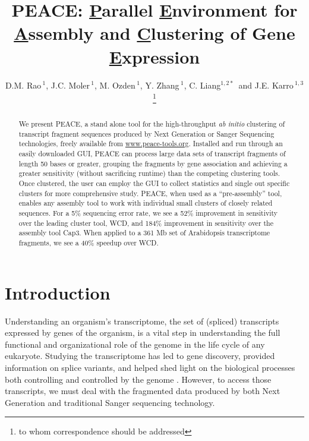 \documentclass[a4,center,fleqn]{NAR}
\newcommand{\peace} {{\small PEACE}}
\newcommand{\wcd} {{\small WCD}}
\newcommand{\capthree} {{\small Cap3}}
\begin{document}
\title{PEACE: {\underline P}arallel {\underline E}nvironment for {\underline A}ssembly
  and {\underline C}lustering of Gene {\underline E}xpression}

\author{D.M. Rao\,$^{1}$, J.C. Moler\,$^{1}$, M. Ozden\,$^1$, Y. Zhang\,$^{1}$,
  C. Liang$^{1,2*}$\, and J.E. Karro\,$^{1,3}$\footnote{to whom
    correspondence should be addressed}}

\address{$^1$ Department of Computer Science and Software Engineering, \\
  $^2$ Department of Botany, \\
  $^3$ and Department of Microbiology, Miami University, Oxford, Ohio,
  USA}




\maketitle

\begin{abstract}
  We present \peace, a stand alone tool for the high-throughput {\it
    ab initio} clustering of transcript fragment sequences produced by
  Next Generation or Sanger Sequencing technologies, freely available
  from \href{http://www.peace-tools.org}{www.peace-tools.org}.
  Installed and run through an easily downloaded GUI, \peace\/ can
  process large data sets of transcript fragments of length 50 bases
  or greater, grouping the fragments by gene association and achieving
  a greater sensitivity (without sacrificing runtime) than the
  competing clustering tools.  Once clustered, the user can employ the
  GUI to collect statistics and single out specific clusters for more
  comprehensive study.  \peace\/, when used as a ``pre-assembly''
  tool, enables any assembly tool to work with individual small
  clusters of closely related sequences.  For a 5\% sequencing error
  rate, we see a 52\% improvement in sensitivity over the leading
  cluster tool, \wcd\/, and 184\% improvement in sensitivity over the
  assembly tool \capthree.  When applied to a 361 Mb set of
  Arabidopsis transcriptome fragments, we see a 40\% speedup over
  \wcd.
\end{abstract}


\section{Introduction}

Understanding an organism's transcriptome, the set of (spliced)
transcripts expressed by genes of the organism, is a vital step in
understanding the full functional and organizational role of the
genome in the life cycle of any eukaryote.  Studying the transcriptome
has led to gene discovery, provided information on splice variants,  
and helped shed light on the biological processes both controlling and
controlled by the genome \cite{Nagaraj07}.  However, to access those
transcripts, we must deal with the fragmented data produced by
both Next Generation and traditional Sanger sequencing technology.
\end{document}
